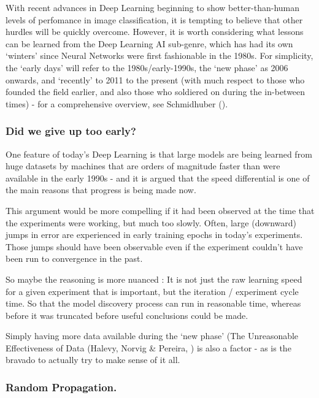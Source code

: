 \documentclass[citeauthoryear]{llncs}
\begin{document}
With recent advances in Deep Learning beginning to show better-than-human 
levels of perfomance in image classification, it is tempting to believe 
that other hurdles will be quickly overcome.  However, it is worth considering
what lessons can be learned from the Deep Learning AI sub-genre, which has 
had its own `winters' since Neural Networks were first fashionable in 
the 1980s.  For simplicity, the `early days' will refer to the 1980s/early-1990s,
the `new phase' as 2006 onwards, and `recently' to 2011 to the present 
(with much respect to those who founded the field earlier, and also 
those who soldiered on during the in-between times) - for a comprehensive 
overview, see Schmidhuber (\cite{SchmidhuberOverview}).


\subsubsection*{Did we give up too early?}
 
One feature of today's Deep Learning is that large models are being learned
from huge datasets by machines that are orders of magnitude faster than 
were available in the early 1990s - and it is argued that the speed 
differential is one of the main reasons that progress is being made now.

This argument would be more compelling if it had been observed at the time 
that the experiments were working, but much too slowly.  Often, large (downward)
jumps in error are experienced in early training epochs in today's experiments.  
Those jumps should have been observable even if the experiment couldn't have 
been run to convergence in the past.  

So maybe the reasoning is more nuanced : It is not just the raw learning speed 
for a given experiment that is important, but the iteration / experiment cycle time.
So that the model discovery process can run in reasonable time, whereas before
it was truncated before useful conclusions could be made.

Simply having more data available during the `new phase' 
(The Unreasonable Effectiveness of Data (Halevy, Norvig \& Pereira, \cite{norvig-UnreasonableEffectivenessOfData})
is also a factor - as is the bravado to actually try to make sense of it all.


\subsubsection*{Random Propagation.}
\end{document}
